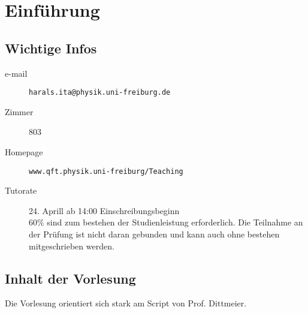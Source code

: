 \setcounter{chapter}{-1}

\chapter{Einführung}

\section{Wichtige Infos}

\begin{description}
	\item[e-mail] \texttt{harals.ita@physik.uni-freiburg.de}
	\item[Zimmer] 803
	\item[Homepage] \texttt{www.qft.physik.uni-freiburg/Teaching}
	\item[Tutorate] 24. Aprill ab 14:00 Einschreibungsbeginn\\
	60\% sind zum bestehen der Studienleistung erforderlich. Die Teilnahme an der Prüfung ist nicht daran gebunden und kann auch ohne bestehen mitgeschrieben werden.
\end{description}

\section{Inhalt der Vorlesung}

Die Vorlesung orientiert sich stark am Script von Prof. Dittmeier.

